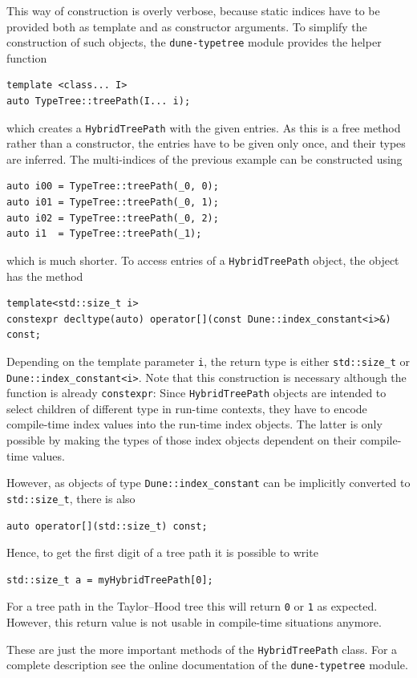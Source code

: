 \documentclass[a4paper,10pt,headings=normal,bibliography=totoc]{scrartcl}
\newcommand{\cpp}[1]{\lstinline[basicstyle=\ttfamily]!#1!}
\newcommand{\dunemodule}[1]{\texttt{#1}}
\begin{document}
This way of construction is overly verbose, because static indices have
to be provided both as template and as constructor arguments.
To simplify the construction of such objects, the \dunemodule{dune-typetree}
module provides the helper function
\begin{lstlisting}[style=Interface]
template <class... I>
auto TypeTree::treePath(I... i);
\end{lstlisting}
which creates a \cpp{HybridTreePath} with the given entries.
As this is a free method rather than a constructor, the entries have to be
given only once, and their types are inferred.
The multi-indices of the previous example can be constructed using
\begin{lstlisting}[style=Example]
auto i00 = TypeTree::treePath(_0, 0);
auto i01 = TypeTree::treePath(_0, 1);
auto i02 = TypeTree::treePath(_0, 2);
auto i1  = TypeTree::treePath(_1);
\end{lstlisting}
which is much shorter.
To access entries of a \cpp{HybridTreePath} object, the object has
the method
%
\begin{lstlisting}[style=Interface]
template<std::size_t i>
constexpr decltype(auto) operator[](const Dune::index_constant<i>&) const;
\end{lstlisting}
%
Depending on the template parameter \cpp{i}, the return type is either \cpp{std::size_t}
or \cpp{Dune::index_constant<i>}.
Note that this construction is necessary although the function is already
\cpp{constexpr}:
Since \cpp{HybridTreePath} objects are intended to select
children of different type in run-time contexts, they have to encode
compile-time index values into the run-time index objects.
The latter is only possible by making the types of those index objects
dependent on their compile-time values.

However, as objects of type \cpp{Dune::index_constant} can be implicitly converted
to \cpp{std::size_t}, there is also
%
\begin{lstlisting}[style=Interface]
auto operator[](std::size_t) const;
\end{lstlisting}
%
Hence, to get the first digit of a tree path it is possible to write
\begin{lstlisting}[style=Example]
std::size_t a = myHybridTreePath[0];
\end{lstlisting}
For a tree path in the Taylor--Hood tree this will return \cpp{0} or \cpp{1}
as expected.  However, this return value is not usable in compile-time situations
anymore.

These are just the more important methods of the \cpp{HybridTreePath} class.
For a complete description see the online
documentation of the \dunemodule{dune-typetree} module.
\end{document}
